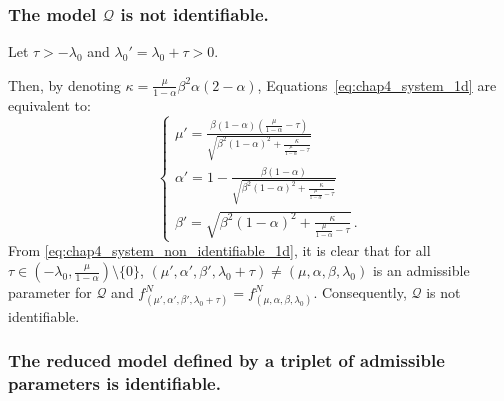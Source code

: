 \begin{subappendices}
\subsubsection*{The model $\mathcal{Q}$ is not identifiable.}
            Let $\tau> -\lambda_0$ and $\lambda_0' = \lambda_0 + \tau > 0$.
    
            Then, by denoting $\kappa = \frac{\mu}{1-\alpha} \beta^2\alpha (2-\alpha)$, Equations~\eqref{eq:chap4_system_1d} are equivalent to:
            \begin{equation}\label{eq:chap4_system_non_identifiable_1d}
            \begin{cases}
              \mu' = \frac{\beta(1-\alpha) (\frac{\mu}{1-\alpha}-\tau)}{\sqrt{\beta^2(1-\alpha)^2 + \frac{\kappa}{\frac{\mu}{1-\alpha}-\tau}}} \\
              \alpha' = 1 - \frac{\beta(1 - \alpha)}{\sqrt{\beta^2(1-\alpha)^2 + \frac{\kappa}{\frac{\mu}{1-\alpha}-\tau}}} \\
              \beta' = \sqrt{\beta^2(1-\alpha)^2 + \frac{\kappa}{\frac{\mu}{1-\alpha}-\tau}}\,.
            \end{cases}
            \end{equation}
      From \eqref{eq:chap4_system_non_identifiable_1d}, it is clear that for all $\tau\in \left(-\lambda_0, \frac{\mu}{1-\alpha} \right)\setminus\{0\}$,
            $(\mu', \alpha', \beta', \lambda_0 + \tau) \neq (\mu, \alpha, \beta, \lambda_0) $ is an admissible parameter for $\mathcal Q$ and
            $f_{(\mu', \alpha', \beta', \lambda_0 + \tau)}^N = f_{(\mu, \alpha, \beta, \lambda_0)}^N$.
            Consequently, $\mathcal Q$ is not identifiable.
            
                              
\subsubsection*{The reduced model defined by a triplet of admissible parameters is identifiable.}
                  

\end{subappendices}
